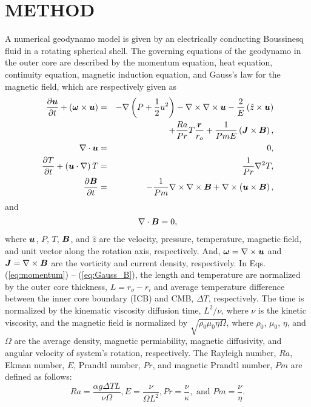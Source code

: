 \section{METHOD}
%
A numerical geodynamo model is given by an electrically conducting Boussinesq fluid in a rotating spherical shell. The governing equations of the geodynamo in the outer core are described by the momentum equation, heat equation, continuity equation, magnetic induction equation, and Gauss's law for the magnetic field, which are respectively given as
%
\begin{eqnarray}
\frac{\partial \bvec{u}}{\partial t} + \left(\bvec{\omega} \times \bvec{u}\right)
 & = & - \nabla \left(P+\frac{1}{2}u^{2} \right) - \nabla \times \nabla \times \bvec{u}
      - \frac{2}{E} \left(\hat{z} \times \bvec{u} \right)
\nonumber \\
 & & + \frac{Ra}{Pr} T \frac{\bvec{r}}{r_{o}}
        + \frac{1}{Pm E} \left(\bvec{J} \times \bvec{B} \right),
\label{eq:momentum} \\
%
\nabla \cdot \bvec{u} & = & 0, 
\label{eq:conservation} \\
%
\frac{\partial T}{\partial t} + \left(\bvec{u} \cdot \nabla \right) T
 & = & \frac{1}{Pr} \nabla^{2} T,
\label{eq:heat} \\
%
 \frac{\partial \bvec{B}}{\partial t}
 & = & -\frac{1}{Pm}  \nabla \times \nabla \times \bvec{B}
       + \nabla \times \left(\bvec{u} \times \bvec{B} \right),
\label{eq:induction}
\end{eqnarray}
%
and
\begin{eqnarray}
\nabla \cdot \mbox{\boldmath$B$} = 0,
\label{eq:Gauss_B}
\end{eqnarray}
%
where $\mbox{\boldmath$u$}$, $P$, $T$, $\mbox{\boldmath$B$}$, and $\hat{z}$ are the velocity, pressure, temperature, magnetic field, and unit vector along the rotation axis, respectively. And, $\mbox{\boldmath$\omega$} = \nabla \times \mbox{\boldmath$u$}$ and $\mbox{\boldmath$J$} = \nabla \times \mbox{\boldmath$B$}$ are the vorticity and current density, respectively.
In Eqs. (\ref{eq:momentum}) – (\ref{eq:Gauss_B}), the length and temperature are normalized by the outer core thickness, $L = r_{o} - r_{i}$ and average temperature difference between the inner core boundary (ICB) and CMB, $\Delta T$, respectively. The time is normalized by the kinematic viscosity diffusion time, $L^{2} / \nu$, where $\nu$ is the kinetic viscosity, and the magnetic field is normalized by $\sqrt{\rho_{0} \mu_{0} \eta \Omega}$, where $\rho_{0}$, $\mu_{0}$, $\eta$, and $\Omega$ are the average density, magnetic permiability, magnetic diffusivity, and angular velocity of system's rotation, respectively.
The Rayleigh number, $Ra$, Ekman number, $E$, Prandtl number, $Pr$, and magnetic Prandtl number,  $Pm$ are defined as follows:
%
\begin{equation}
Ra = \displaystyle{ \frac{\alpha g \Delta T L}{ \nu \Omega} }, 
E  = \displaystyle{ \frac{\nu}{\Omega L^{2}} },
Pr = \displaystyle{ \frac{\nu}{\kappa} }, 
\mbox{ and }
Pm = \displaystyle{ \frac{\nu}{\eta} }.
\label{eq:dimensionless}
\end{equation}
%

